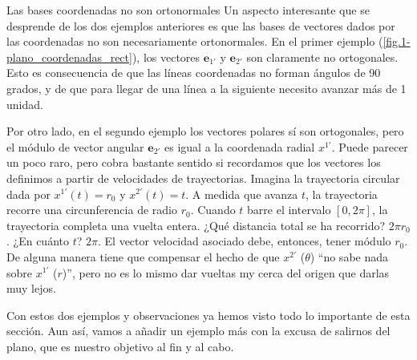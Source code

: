 \begin{observation}
    {Las bases coordenadas no son ortonormales}
    \label{obs.1-bases_no_ortonormales}
    Un aspecto interesante que se desprende de los dos ejemplos anteriores es que las bases de vectores dados por las coordenadas no son necesariamente ortonormales. En el primer ejemplo (\cref{fig.1-plano_coordenadas_rect}), los vectores \(\mathbf{e}_{1'}\) y \(\mathbf{e}_{2'}\) son claramente no ortogonales. Esto es consecuencia de que las líneas coordenadas no forman ángulos de 90 grados, y de que para llegar de una línea a la siguiente necesito avanzar más de 1 unidad.

    Por otro lado, en el segundo ejemplo los vectores polares sí son ortogonales, pero el módulo de vector angular \(\mathbf{e}_{2'}\) es igual a la coordenada radial \(x^{1'}\). Puede parecer un poco raro, pero cobra bastante sentido si recordamos que los vectores los definimos a partir de velocidades de trayectorias. Imagina la trayectoria circular dada por \(x^{1'}(t)=r_0\) y \(x^{2'}(t)=t\). A medida que avanza \(t\), la trayectoria recorre una circunferencia de radio \(r_0\). Cuando \(t\) barre el intervalo \([0, 2\pi]\), la trayectoria completa una vuelta entera. ¿Qué distancia total se ha recorrido? \(2\pi r_0\). ¿En cuánto \(t\)? \(2\pi\). El vector velocidad asociado debe, entonces, tener módulo \(r_0\). De alguna manera tiene que compensar el hecho de que \(x^{2'}\) (\(\theta\)) ``no sabe nada sobre \(x^{1'}\) (\(r\))'', pero no es lo mismo dar vueltas my cerca del origen que darlas muy lejos.
\end{observation}

Con estos dos ejemplos y observaciones ya hemos visto todo lo importante de esta sección. Aun así, vamos a añadir un ejemplo más con la excusa de salirnos del plano, que es nuestro objetivo al fin y al cabo.

